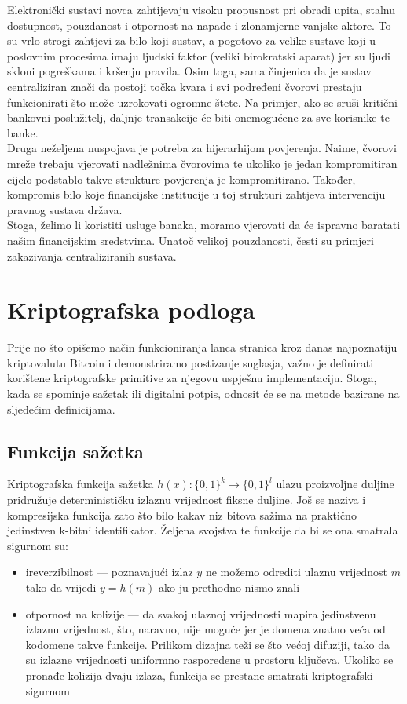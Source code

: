 \documentclass[utf8, zavrsni]{fer}
\begin{document}
Elektronički sustavi novca zahtijevaju visoku propusnost pri obradi upita, stalnu dostupnost, pouzdanost i otpornost na napade i zlonamjerne vanjske aktore. To su vrlo strogi zahtjevi za bilo koji sustav, a pogotovo za velike sustave koji u poslovnim procesima imaju ljudski faktor (veliki birokratski aparat) jer su ljudi skloni pogreškama i kršenju pravila. Osim toga, sama činjenica da je sustav centraliziran znači da postoji točka kvara i svi podređeni čvorovi prestaju funkcionirati što može uzrokovati ogromne štete. Na primjer, ako se sruši kritični bankovni poslužitelj, daljnje transakcije će biti onemogućene za sve korisnike te banke. \\

Druga neželjena nuspojava je potreba za hijerarhijom povjerenja. Naime, čvorovi mreže trebaju vjerovati nadležnima čvorovima te ukoliko je jedan kompromitiran cijelo podstablo takve strukture povjerenja je kompromitirano. Također, kompromis bilo koje financijske institucije u toj strukturi zahtjeva intervenciju pravnog sustava država. \\

Stoga, želimo li koristiti usluge banaka, moramo vjerovati da će ispravno baratati našim financijskim sredstvima.
Unatoč velikoj pouzdanosti, česti su primjeri zakazivanja centraliziranih sustava.

\chapter{Kriptografska podloga}
Prije no što opišemo način funkcioniranja lanca stranica kroz danas najpoznatiju kriptovalutu Bitcoin i demonstriramo postizanje suglasja, važno je definirati korištene kriptografske primitive za njegovu uspješnu implementaciju. Stoga, kada se spominje sažetak ili digitalni potpis, odnosit će se na metode bazirane na sljedećim definicijama.

\section{Funkcija sažetka}
Kriptografska funkcija sažetka $h(x): \{0,1\}^k \rightarrow \{0,1\}^l$ ulazu proizvoljne duljine pridružuje determinističku izlaznu vrijednost fiksne duljine. Još se naziva i kompresijska funkcija zato što bilo kakav niz bitova sažima na praktično jedinstven k-bitni identifikator. Željena svojstva te funkcije da bi se ona smatrala sigurnom su:

\begin{itemize}
	\item ireverzibilnost --- poznavajući izlaz $y$ ne možemo odrediti ulaznu vrijednost $m$ tako da vrijedi $y = h(m)$ ako ju prethodno nismo znali
	\item otpornost na kolizije --- da svakoj ulaznoj vrijednosti mapira jedinstvenu izlaznu vrijednost, što, naravno, nije moguće jer je domena znatno veća od kodomene takve funkcije. Prilikom dizajna teži se što većoj difuziji, tako da su izlazne vrijednosti uniformno raspoređene u prostoru ključeva. Ukoliko se pronađe kolizija dvaju izlaza, funkcija se prestane smatrati kriptografski sigurnom
\end{itemize}
\end{document}
